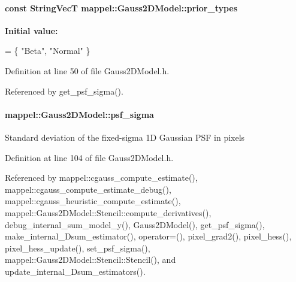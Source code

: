 \paragraph[{\texorpdfstring{prior\+\_\+types}{prior_types}}]{\setlength{\rightskip}{0pt plus 5cm}const {\bf String\+VecT} mappel\+::\+Gauss2\+D\+Model\+::prior\+\_\+types\hspace{0.3cm}{\ttfamily [static]}}\hypertarget{classmappel_1_1Gauss2DModel_a3bd9cb65f8d41f7b7707e3c4e1299dc2}{}\label{classmappel_1_1Gauss2DModel_a3bd9cb65f8d41f7b7707e3c4e1299dc2}
{\bfseries Initial value\+:}
\begin{DoxyCode}
= \{ \textcolor{stringliteral}{"Beta"}, 
                                                       \textcolor{stringliteral}{"Normal"}  
                                                      \}
\end{DoxyCode}


Definition at line 50 of file Gauss2\+D\+Model.\+h.



Referenced by get\+\_\+psf\+\_\+sigma().

\paragraph[{\texorpdfstring{psf\+\_\+sigma}{psf_sigma}}]{ mappel\+::\+Gauss2\+D\+Model\+::psf\+\_\+sigma\hspace{0.3cm}{\ttfamily [protected]}}\hypertarget{classmappel_1_1Gauss2DModel_acb73f86ea080515e843f47be9502b271}{}\label{classmappel_1_1Gauss2DModel_acb73f86ea080515e843f47be9502b271}
Standard deviation of the fixed-\/sigma 1D Gaussian P\+SF in pixels 

Definition at line 104 of file Gauss2\+D\+Model.\+h.



Referenced by mappel\+::cgauss\+\_\+compute\+\_\+estimate(), mappel\+::cgauss\+\_\+compute\+\_\+estimate\+\_\+debug(), mappel\+::cgauss\+\_\+heuristic\+\_\+compute\+\_\+estimate(), mappel\+::\+Gauss2\+D\+Model\+::\+Stencil\+::compute\+\_\+derivatives(), debug\+\_\+internal\+\_\+sum\+\_\+model\+\_\+y(), Gauss2\+D\+Model(), get\+\_\+psf\+\_\+sigma(), make\+\_\+internal\+\_\+Dsum\+\_\+estimator(), operator=(), pixel\+\_\+grad2(), pixel\+\_\+hess(), pixel\+\_\+hess\+\_\+update(), set\+\_\+psf\+\_\+sigma(), mappel\+::\+Gauss2\+D\+Model\+::\+Stencil\+::\+Stencil(), and update\+\_\+internal\+\_\+Dsum\+\_\+estimators().

